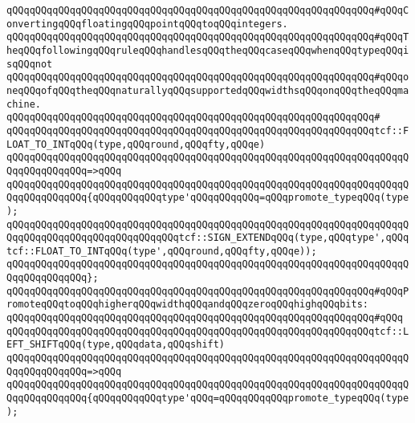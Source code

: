 \newline
\verb|qQQqqQQqqQQqqQQqqQQqqQQqqQQqqQQqqQQqqQQqqQQqqQQqqQQqqQQqqQQqqQQq#qQQqConvertingqQQqfloatingqQQqpointqQQqtoqQQqintegers.|\newline
\verb|qQQqqQQqqQQqqQQqqQQqqQQqqQQqqQQqqQQqqQQqqQQqqQQqqQQqqQQqqQQqqQQq#qQQqTheqQQqfollowingqQQqruleqQQqhandlesqQQqtheqQQqcaseqQQqwhenqQQqtypeqQQqisqQQqnot|\newline
\verb|qQQqqQQqqQQqqQQqqQQqqQQqqQQqqQQqqQQqqQQqqQQqqQQqqQQqqQQqqQQqqQQq#qQQqoneqQQqofqQQqtheqQQqnaturallyqQQqsupportedqQQqwidthsqQQqonqQQqtheqQQqmachine.|\newline
\verb|qQQqqQQqqQQqqQQqqQQqqQQqqQQqqQQqqQQqqQQqqQQqqQQqqQQqqQQqqQQqqQQq#|\newline
\verb|qQQqqQQqqQQqqQQqqQQqqQQqqQQqqQQqqQQqqQQqqQQqqQQqqQQqqQQqqQQqqQQqtcf::FLOAT_TO_INTqQQq(type,qQQqround,qQQqfty,qQQqe)|\newline
\verb|qQQqqQQqqQQqqQQqqQQqqQQqqQQqqQQqqQQqqQQqqQQqqQQqqQQqqQQqqQQqqQQqqQQqqQQqqQQqqQQqqQQq=>qQQq|\newline
\verb|qQQqqQQqqQQqqQQqqQQqqQQqqQQqqQQqqQQqqQQqqQQqqQQqqQQqqQQqqQQqqQQqqQQqqQQqqQQqqQQqqQQq{qQQqqQQqqQQqtype'qQQqqQQqqQQq=qQQqpromote_typeqQQq(type);|\newline
\newline
\verb|qQQqqQQqqQQqqQQqqQQqqQQqqQQqqQQqqQQqqQQqqQQqqQQqqQQqqQQqqQQqqQQqqQQqqQQqqQQqqQQqqQQqqQQqqQQqqQQqqQQqtcf::SIGN_EXTENDqQQq(type,qQQqtype',qQQqtcf::FLOAT_TO_INTqQQq(type',qQQqround,qQQqfty,qQQqe));|\newline
\verb|qQQqqQQqqQQqqQQqqQQqqQQqqQQqqQQqqQQqqQQqqQQqqQQqqQQqqQQqqQQqqQQqqQQqqQQqqQQqqQQqqQQq};|\newline
\newline
\verb|qQQqqQQqqQQqqQQqqQQqqQQqqQQqqQQqqQQqqQQqqQQqqQQqqQQqqQQqqQQqqQQq#qQQqPromoteqQQqtoqQQqhigherqQQqwidthqQQqandqQQqzeroqQQqhighqQQqbits:|\newline
\verb|qQQqqQQqqQQqqQQqqQQqqQQqqQQqqQQqqQQqqQQqqQQqqQQqqQQqqQQqqQQqqQQq#qQQq|\newline
\verb|qQQqqQQqqQQqqQQqqQQqqQQqqQQqqQQqqQQqqQQqqQQqqQQqqQQqqQQqqQQqqQQqtcf::LEFT_SHIFTqQQq(type,qQQqdata,qQQqshift)|\newline
\verb|qQQqqQQqqQQqqQQqqQQqqQQqqQQqqQQqqQQqqQQqqQQqqQQqqQQqqQQqqQQqqQQqqQQqqQQqqQQqqQQqqQQq=>qQQq|\newline
\verb|qQQqqQQqqQQqqQQqqQQqqQQqqQQqqQQqqQQqqQQqqQQqqQQqqQQqqQQqqQQqqQQqqQQqqQQqqQQqqQQqqQQq{qQQqqQQqqQQqtype'qQQq=qQQqqQQqqQQqpromote_typeqQQq(type);|\newline
\newline
